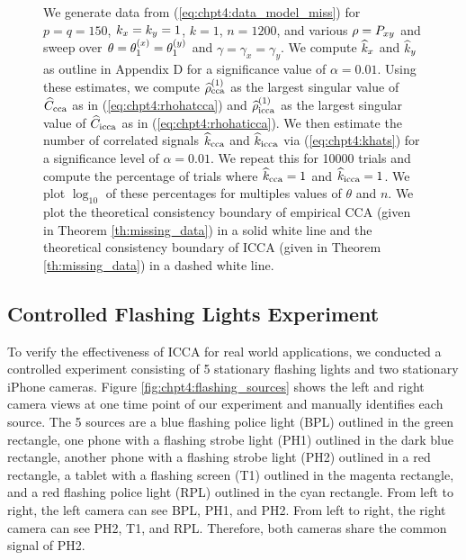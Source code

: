 \begin{figure}
\begin{center}
{    }
    \caption{We generate data from (\ref{eq:chpt4:data_model_miss}) for $p=q=150$,
      $k_x=k_y=1$, $k=1$, $n=1200$, and various $\rho=P_{xy}$ and sweep over $\theta =
      \theta^{(x)}_1=\theta^{(y)}_1$ and $\gamma=\gamma_x=\gamma_y$. We compute $\widehat{k}_x$ and $\widehat{k}_y$ as
      outline in Appendix D for a significance value of $\alpha=0.01$. Using these
      estimates, we compute $\widehat{\rho}_\text{cca}^{(1)}$ as the largest singular value of $\widehat{C}_{\text{cca}}$
      as in (\ref{eq:chpt4:rhohatcca}) and $\widehat{\rho}_\text{icca}^{(1)}$ as the largest singular
      value of $\widehat{C}_{\text{icca}}$ as in (\ref{eq:chpt4:rhohaticca}). We then estimate the number
      of correlated signals $\widehat{k}_{\text{cca}}$ and $\widehat{k}_{\text{icca}}$ via (\ref{eq:chpt4:khats}) for a
      significance level of $\alpha=0.01$. We repeat this for 10000 trials and compute the
      percentage of trials where $\widehat{k}_{\text{cca}}=1$ and $\widehat{k}_{\text{icca}}=1$. We plot $\log_{10}$ of
      these percentages for multiples values of $\theta$ and $n$. We plot the theoretical
      consistency boundary of empirical CCA (given in Theorem \ref{th:missing_data}) in a
      solid white line and the theoretical consistency boundary of ICCA (given in Theorem
      \ref{th:missing_data}) in a dashed white line.}
    \label{fig:chpt4:cca_missing_75}
  \end{center}
\end{figure}

\subsection{Controlled Flashing Lights Experiment}

To verify the effectiveness of ICCA for real world applications, we conducted a controlled
experiment consisting of 5 stationary flashing lights and two stationary iPhone
cameras. Figure \ref{fig:chpt4:flashing_sources} shows the left and right camera views at
one time point of our experiment and manually identifies each source. The 5 sources are a
blue flashing police light (BPL) outlined in the green rectangle, one phone with a
flashing strobe light (PH1) outlined in the dark blue rectangle, another phone with a
flashing strobe light (PH2) outlined in a red rectangle, a tablet with a flashing screen
(T1) outlined in the magenta rectangle, and a red flashing police light (RPL) outlined in
the cyan rectangle. From left to right, the left camera can see BPL, PH1, and PH2. From
left to right, the right camera can see PH2, T1, and RPL. Therefore, both cameras share
the common signal of PH2.

